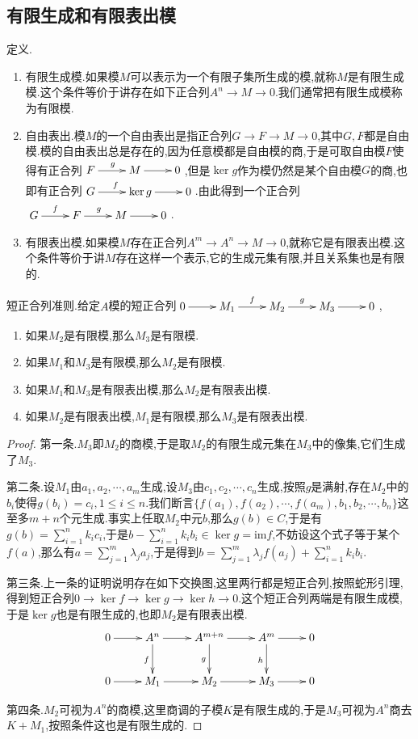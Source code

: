 \subsection{有限生成和有限表出模}

定义.
\begin{enumerate}
	\item 有限生成模.如果模$M$可以表示为一个有限子集所生成的模,就称$M$是有限生成模.这个条件等价于讲存在如下正合列$A^n\to M\to0$.我们通常把有限生成模称为有限模.
	\item 自由表出.模$M$的一个自由表出是指正合列$G\to F\to M\to0$,其中$G,F$都是自由模.模的自由表出总是存在的,因为任意模都是自由模的商,于是可取自由模$F$使得有正合列$\xymatrix{F\ar[r]^g&M\ar[r]&0}$,但是$\ker g$作为模仍然是某个自由模$G$的商,也即有正合列$\xymatrix{G\ar[r]^f&\ker g\ar[r]&0}$.由此得到一个正合列$\xymatrix{G\ar[r]^f&F\ar[r]^g&M\ar[r]&0}$.
	\item 有限表出模.如果模$M$存在正合列$A^m\to A^n\to M\to0$,就称它是有限表出模.这个条件等价于讲$M$存在这样一个表示,它的生成元集有限,并且关系集也是有限的.
\end{enumerate}

短正合列准则.给定$A$模的短正合列$\xymatrix{0\ar[r]&M_1\ar[r]^f&M_2\ar[r]^g&M_3\ar[r]&0}$,
\begin{enumerate}
	\item 如果$M_2$是有限模,那么$M_3$是有限模.
	\item 如果$M_1$和$M_3$是有限模,那么$M_2$是有限模.
	\item 如果$M_1$和$M_3$是有限表出模,那么$M_2$是有限表出模.
	\item 如果$M_2$是有限表出模,$M_1$是有限模,那么$M_3$是有限表出模.
\end{enumerate}
\begin{proof}
	
	第一条.$M_3$即$M_2$的商模,于是取$M_2$的有限生成元集在$M_3$中的像集,它们生成了$M_3$.
	
	第二条.设$M_1$由$a_1,a_2,\cdots,a_m$生成,设$M_3$由$c_1,c_2,\cdots,c_n$生成,按照$g$是满射,存在$M_2$中的$b_i$使得$g(b_i)=c_i,1\le i\le n$.我们断言$\{f(a_1),f(a_2),\cdots,f(a_m),b_1,b_2,\cdots,b_n\}$这至多$m+n$个元生成.事实上任取$M_2$中元$b$,那么$g(b)\in C$,于是有$g(b)=\sum_{i=1}^nk_ic_i$,于是$b-\sum_{i=1}^nk_ib_i\in\ker g=\mathrm{im}f$,不妨设这个式子等于某个$f(a)$,那么有$a=\sum_{j=1}^m\lambda_ja_j$,于是得到$b=\sum_{j=1}^m\lambda_jf(a_j)+\sum_{i=1}^nk_ib_i$.
	
	第三条.上一条的证明说明存在如下交换图,这里两行都是短正合列,按照蛇形引理,得到短正合列$0\to\ker f\to\ker g\to\ker h\to0$.这个短正合列两端是有限生成模,于是$\ker g$也是有限生成的,也即$M_2$是有限表出模.
	$$\xymatrix{0\ar[r]&A^n\ar[r]\ar[d]_f&A^{m+n}\ar[r]\ar[d]_g&A^m\ar[r]\ar[d]_h&0\\0\ar[r]&M_1\ar[r]&M_2\ar[r]&M_3\ar[r]&0}$$
	
	第四条.$M_2$可视为$A^n$的商模,这里商调的子模$K$是有限生成的,于是$M_3$可视为$A^n$商去$K+M_1$,按照条件这也是有限生成的.
\end{proof}

